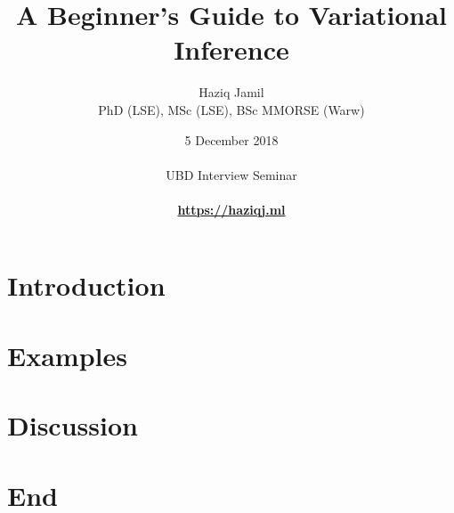 \documentclass[]{beamer}
\begin{document}

\title[Variational inference]{A Beginner's Guide to Variational Inference}
\author[Haziq Jamil]{
  \large{Haziq Jamil}\\
  {\scriptsize PhD (LSE), MSc (LSE), BSc MMORSE (Warw)}
}
\date[Nov 2018]{
  5 December 2018\\
  \hspace{1cm}\\
  UBD Interview Seminar\\
  \hspace{1cm}\\
  \href{https://haziqj.ml}{\color{fu-red!60} \textbf{https://haziqj.ml}}
}

\mytitle

\mytoc


\section{Introduction}


\section[Examples]{Examples}
\transition


\section{Discussion}
\transition


\section*{End}
\thankyou
\end{document}
